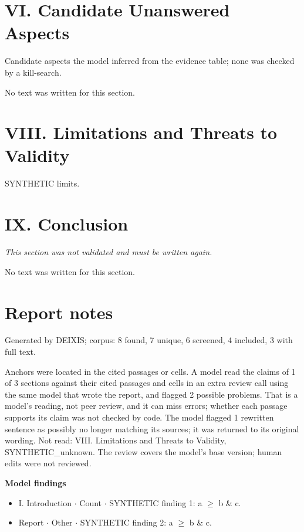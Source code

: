 \documentclass[journal]{IEEEtran}
\begin{document}
\section*{VI. Candidate Unanswered Aspects}

Candidate aspects the model inferred from the evidence table; none was checked by a kill-search.

No text was written for this section.

\section*{VIII. Limitations and Threats to Validity}

SYNTHETIC limits.

\section*{IX. Conclusion}

\noindent\textit{This section was not validated and must be written again.}

No text was written for this section.

\section*{Report notes}

Generated by DEIXIS; corpus: 8 found, 7 unique, 6 screened, 4 included, 3 with full text.

Anchors were located in the cited passages or cells. A model read the claims of 1 of 3 sections against their cited passages and cells in an extra review call using the same model that wrote the report, and flagged 2 possible problems. That is a model’s reading, not peer review, and it can miss errors; whether each passage supports its claim was not checked by code. The model flagged 1 rewritten sentence as possibly no longer matching its sources; it was returned to its original wording. Not read: VIII. Limitations and Threats to Validity, SYNTHETIC\_unknown. The review covers the model's base version; human edits were not reviewed.

\noindent\textbf{Model findings}

\begin{itemize}
\item I. Introduction \ensuremath{\cdot} Count \ensuremath{\cdot} SYNTHETIC finding 1: a \ensuremath{\geq} b \& c.
\item Report \ensuremath{\cdot} Other \ensuremath{\cdot} SYNTHETIC finding 2: a \ensuremath{\geq} b \& c.
\end{itemize}
\end{document}
